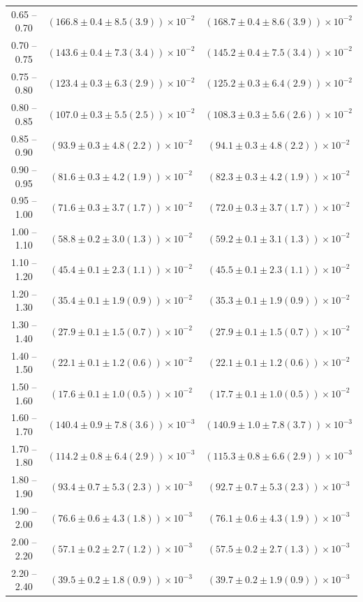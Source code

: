 \begin{table}
\begin{center}
\begin{tabular}{ c | c c }
0.65 -- 0.70 & $(166.8\pm0.4\pm8.5(3.9))\times10^{-2}$ & $(168.7\pm0.4\pm8.6(3.9))\times10^{-2}$ \\ 
0.70 -- 0.75 & $(143.6\pm0.4\pm7.3(3.4))\times10^{-2}$ & $(145.2\pm0.4\pm7.5(3.4))\times10^{-2}$ \\ 
0.75 -- 0.80 & $(123.4\pm0.3\pm6.3(2.9))\times10^{-2}$ & $(125.2\pm0.3\pm6.4(2.9))\times10^{-2}$ \\ 
0.80 -- 0.85 & $(107.0\pm0.3\pm5.5(2.5))\times10^{-2}$ & $(108.3\pm0.3\pm5.6(2.6))\times10^{-2}$ \\ 
0.85 -- 0.90 & $(93.9\pm0.3\pm4.8(2.2))\times10^{-2}$ & $(94.1\pm0.3\pm4.8(2.2))\times10^{-2}$ \\ 
0.90 -- 0.95 & $(81.6\pm0.3\pm4.2(1.9))\times10^{-2}$ & $(82.3\pm0.3\pm4.2(1.9))\times10^{-2}$ \\ 
0.95 -- 1.00 & $(71.6\pm0.3\pm3.7(1.7))\times10^{-2}$ & $(72.0\pm0.3\pm3.7(1.7))\times10^{-2}$ \\ 
1.00 -- 1.10 & $(58.8\pm0.2\pm3.0(1.3))\times10^{-2}$ & $(59.2\pm0.1\pm3.1(1.3))\times10^{-2}$ \\ 
1.10 -- 1.20 & $(45.4\pm0.1\pm2.3(1.1))\times10^{-2}$ & $(45.5\pm0.1\pm2.3(1.1))\times10^{-2}$ \\ 
1.20 -- 1.30 & $(35.4\pm0.1\pm1.9(0.9))\times10^{-2}$ & $(35.3\pm0.1\pm1.9(0.9))\times10^{-2}$ \\ 
1.30 -- 1.40 & $(27.9\pm0.1\pm1.5(0.7))\times10^{-2}$ & $(27.9\pm0.1\pm1.5(0.7))\times10^{-2}$ \\ 
1.40 -- 1.50 & $(22.1\pm0.1\pm1.2(0.6))\times10^{-2}$ & $(22.1\pm0.1\pm1.2(0.6))\times10^{-2}$ \\ 
1.50 -- 1.60 & $(17.6\pm0.1\pm1.0(0.5))\times10^{-2}$ & $(17.7\pm0.1\pm1.0(0.5))\times10^{-2}$ \\ 
1.60 -- 1.70 & $(140.4\pm0.9\pm7.8(3.6))\times10^{-3}$ & $(140.9\pm1.0\pm7.8(3.7))\times10^{-3}$ \\ 
1.70 -- 1.80 & $(114.2\pm0.8\pm6.4(2.9))\times10^{-3}$ & $(115.3\pm0.8\pm6.6(2.9))\times10^{-3}$ \\ 
1.80 -- 1.90 & $(93.4\pm0.7\pm5.3(2.3))\times10^{-3}$ & $(92.7\pm0.7\pm5.3(2.3))\times10^{-3}$ \\ 
1.90 -- 2.00 & $(76.6\pm0.6\pm4.3(1.8))\times10^{-3}$ & $(76.1\pm0.6\pm4.3(1.9))\times10^{-3}$ \\ 
2.00 -- 2.20 & $(57.1\pm0.2\pm2.7(1.2))\times10^{-3}$ & $(57.5\pm0.2\pm2.7(1.3))\times10^{-3}$ \\ 
2.20 -- 2.40 & $(39.5\pm0.2\pm1.8(0.9))\times10^{-3}$ & $(39.7\pm0.2\pm1.9(0.9))\times10^{-3}$ \\ 

\end{tabular}
\end{center}
\end{table}
